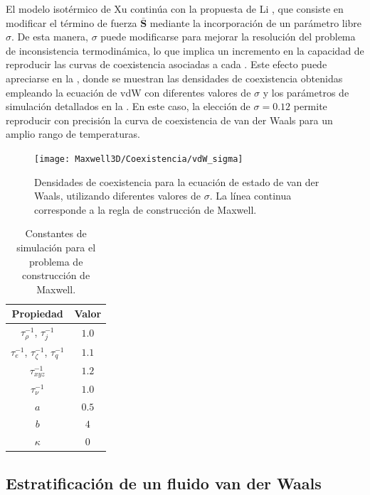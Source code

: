 \FloatBarrier

El modelo isot\'ermico de Xu contin\'ua con la propuesta de Li \cite{li_forcing_2012}, que consiste en modificar el t\'ermino de fuerza $\bar{\bm{S}}$ mediante la incorporaci\'on de un par\'ametro libre $\sigma$. De esta manera, $\sigma$ puede modificarse para mejorar la resoluci\'on del problema de inconsistencia termodin\'amica, lo que implica un incremento en la capacidad de reproducir las curvas de coexistencia asociadas a cada \eos{}. Este efecto puede apreciarse en la , donde se muestran las densidades de coexistencia obtenidas empleando la ecuaci\'on de vdW con diferentes valores de $\sigma$ y los par\'ametros de simulaci\'on detallados en la . En este caso, la elecci\'on de $\sigma=0.12$ permite reproducir con precisi\'on la curva de coexistencia de van der Waals para un amplio rango de temperaturas.

\begin{figure}[ht]
	\centering
	\texttt{[image: Maxwell3D/Coexistencia/vdW\_sigma]}
	\caption{Densidades de coexistencia para la ecuaci\'on de estado de van der Waals, utilizando diferentes valores de $\sigma$. La l\'inea continua corresponde a la regla de construcci\'on de Maxwell.}
	\label{fig:vdW_coex_3D}
\end{figure}

\begin{table}[ht]
	\centering
    \begin{tabular}{c c}
	    \toprule
        \bf Propiedad & \bf Valor \\
        \midrule
        $\tau_{\rho}^{-1}$, $\tau_{j}^{-1}$ & $1.0$\\
        $\tau_{e}^{-1}$, $\tau_{\zeta}^{-1}$, $\tau_{q}^{-1}$ & $1.1$ \\
        $\tau_{xyz}^{-1}$ & $1.2$ \\        
        $\tau_{\nu}^{-1}$ & $1.0$ \\
		$a$ & $0.5$ \\
		$b$ & $4$ \\        
        $\kappa$ & $0$ \\
        \bottomrule
	\end{tabular}
	\caption{Constantes de simulaci\'on para el problema de construcci\'on de Maxwell.}
	\label{tab:mx3D_prop}
\end{table}  




\subsection{Estratificaci\'on de un fluido van der Waals}


